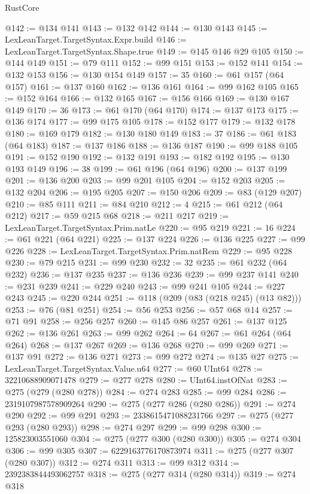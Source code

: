 \begin{lexlean}{RustCore}
\begin{coremodule}
@142 := @134 @141
@143 := @132 @142
@144 := @130 @143
@145 := LexLeanTarget.TargetSyntax.Expr.build
@146 := LexLeanTarget.TargetSyntax.Shape.true
@149 := @145 @146 @29 @105
@150 := @144 @149
@151 := @79 @111
@152 := @99 @151
@153 := @152 @141
@154 := @132 @153
@156 := @130 @154 @149
@157 := 35
@160 := @61 @157 (@64 @157)
@161 := @137 @160
@162 := @136 @161
@164 := @99 @162 @105
@165 := @152 @164
@166 := @132 @165
@167 := @156 @166
@169 := @130 @167 @149
@170 := 36
@173 := @61 @170 (@64 @170)
@174 := @137 @173
@175 := @136 @174
@177 := @99 @175 @105
@178 := @152 @177
@179 := @132 @178
@180 := @169 @179
@182 := @130 @180 @149
@183 := 37
@186 := @61 @183 (@64 @183)
@187 := @137 @186
@188 := @136 @187
@190 := @99 @188 @105
@191 := @152 @190
@192 := @132 @191
@193 := @182 @192
@195 := @130 @193 @149
@196 := 38
@199 := @61 @196 (@64 @196)
@200 := @137 @199
@201 := @136 @200
@203 := @99 @201 @105
@204 := @152 @203
@205 := @132 @204
@206 := @195 @205
@207 := @150 @206
@209 := @83 (@129 @207)
@210 := @85 @111
@211 := @84 @210
@212 := 4
@215 := @61 @212 (@64 @212)
@217 := @59 @215 @68
@218 := @211 @217
@219 := LexLeanTarget.TargetSyntax.Prim.natLe
@220 := @95 @219
@221 := 16
@224 := @61 @221 (@64 @221)
@225 := @137 @224
@226 := @136 @225
@227 := @99 @226
@228 := LexLeanTarget.TargetSyntax.Prim.natRem
@229 := @95 @228
@230 := @79 @215
@231 := @99 @230
@232 := 32
@235 := @61 @232 (@64 @232)
@236 := @137 @235
@237 := @136 @236
@239 := @99 @237 @141
@240 := @231 @239
@241 := @229 @240
@243 := @99 @241 @105
@244 := @227 @243
@245 := @220 @244
@251 := @118 (@209 (@83 (@218 @245) (@13 @82)))
@253 := @76 (@81 @251)
@254 := @56 @253
@256 := @57 @68 @14
@257 := @71 @91
@258 := @256 @257
@260 := @145 @86 @257
@261 := @137 @125
@262 := @136 @261
@263 := @99 @262
@264 := 64
@267 := @61 @264 (@64 @264)
@268 := @137 @267
@269 := @136 @268
@270 := @99 @269
@271 := @137 @91
@272 := @136 @271
@273 := @99 @272
@274 := @135 @27
@275 := LexLeanTarget.TargetSyntax.Value.u64
@277 := @60 UInt64
@278 := 32210688909071478
@279 := @277 @278
@280 := UInt64.instOfNat
@283 := @275 (@279 (@280 @278))
@284 := @274 @283
@285 := @99 @284
@286 := 2319107987578909264
@290 := @275 (@277 @286 (@280 @286))
@291 := @274 @290
@292 := @99 @291
@293 := 2338615471088231766
@297 := @275 (@277 @293 (@280 @293))
@298 := @274 @297
@299 := @99 @298
@300 := 125823003551060
@304 := @275 (@277 @300 (@280 @300))
@305 := @274 @304
@306 := @99 @305
@307 := 6229163776170873974
@311 := @275 (@277 @307 (@280 @307))
@312 := @274 @311
@313 := @99 @312
@314 := 2392383844493062757
@318 := @275 (@277 @314 (@280 @314))
@319 := @274 @318

\end{coremodule}
\end{lexlean}
